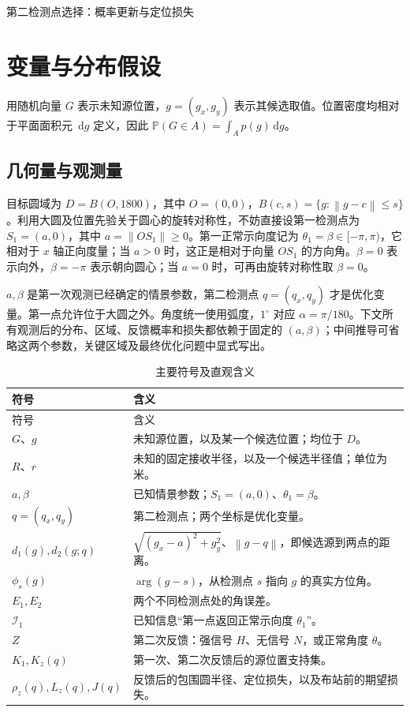 \documentclass[UTF8,a4paper,zihao=-4,fontset=none]{ctexart}
\numberwithin{equation}{section}
\newcommand{\dd}{\,\mathrm d}
\newcommand{\Prob}{\mathbb P}
\newcommand{\norm}[1]{\left\lVert#1\right\rVert}
\begin{document}
\begin{center}
{\normalfont\LARGE\sffamily\mdseries 第二检测点选择：概率更新与定位损失}\par
\end{center}
\vspace{2em}

\section{变量与分布假设}
用随机向量 \(G\) 表示未知源位置，\(g=(g_x,g_y)\) 表示其候选取值。位置密度均相对于平面面积元 \(\dd g\) 定义，因此 \(\Prob(G\in A)=\int_A p(g)\dd g\)。

\subsection{几何量与观测量}
目标圆域为 \(D=B(O,1800)\)，其中 \(O=(0,0)\)，\(B(c,s)=\{g:\norm{g-c}\le s\}\)。利用大圆及位置先验关于圆心的旋转对称性，不妨直接设第一检测点为 \(S_1=(a,0)\)，其中 \(a=\norm{OS_1}\ge0\)。第一正常示向度记为 \(\theta_1=\beta\in[-\pi,\pi)\)，它相对于 \(x\) 轴正向度量；当 \(a>0\) 时，这正是相对于向量 \(OS_1\) 的方向角。\(\beta=0\) 表示向外，\(\beta=-\pi\) 表示朝向圆心；当 \(a=0\) 时，可再由旋转对称性取 \(\beta=0\)。

\(a,\beta\) 是第一次观测已经确定的情景参数，第二检测点 \(q=(q_x,q_y)\) 才是优化变量。第一点允许位于大圆之外。角度统一使用弧度，\(1^\circ\) 对应 \(\alpha=\pi/180\)。下文所有观测后的分布、区域、反馈概率和损失都依赖于固定的 \((a,\beta)\)；中间推导可省略这两个参数，关键区域及最终优化问题中显式写出。

\begin{longtable}{p{}p{}}
\caption{主要符号及直观含义}\label{tab:symbols}\\
\toprule 符号 & 含义 \\\midrule\endfirsthead
\toprule 符号 & 含义 \\\midrule\endhead
\bottomrule\endfoot
\(G\)、\(g\) & 未知源位置，以及某一个候选位置；均位于 \(D\)。\\
\(R\)、\(r\) & 未知的固定接收半径，以及一个候选半径值；单位为米。\\
\(a,\beta\) & 已知情景参数；\(S_1=(a,0)\)、\(\theta_1=\beta\)。\\
\(q=(q_x,q_y)\) & 第二检测点；两个坐标是优化变量。\\
\(d_1(g),d_2(g;q)\) & \(\sqrt{(g_x-a)^2+g_y^2}\)、\(\norm{g-q}\)，即候选源到两点的距离。\\
\(\phi_s(g)\) & \(\arg(g-s)\)，从检测点 \(s\) 指向 \(g\) 的真实方位角。\\
\(E_1,E_2\) & 两个不同检测点处的角误差。\\
\(\mathcal I_1\) & 已知信息“第一点返回正常示向度 \(\theta_1\)”。\\
\(Z\) & 第二次反馈：强信号 \(H\)、无信号 \(N\)，或正常角度 \(\theta\)。\\
\(K_1,K_z(q)\) & 第一次、第二次反馈后的源位置支持集。\\
\(\rho_z(q),L_z(q),J(q)\) & 反馈后的包围圆半径、定位损失，以及布站前的期望损失。\\
\end{longtable}
\end{document}
